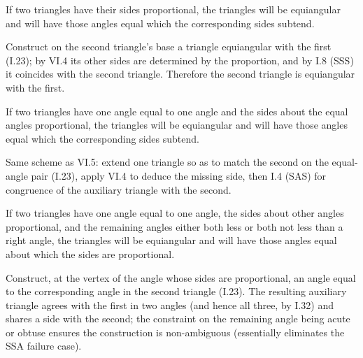 \documentclass{rrxiv}
\begin{document}
\begin{claim}
\label{prop:VI.5}
If two triangles have their sides proportional, the triangles will be
equiangular and will have those angles equal which the corresponding
sides subtend.
\end{claim}
\begin{evidence}[Proof of VI.5]
\label{ev:VI.5}
Construct on the second triangle's base a triangle equiangular with
the first (I.23); by VI.4 its other sides are determined by the
proportion, and by I.8 (SSS) it coincides with the second triangle.
Therefore the second triangle is equiangular with the first.
\end{evidence}

\begin{claim}
\label{prop:VI.6}
If two triangles have one angle equal to one angle and the sides
about the equal angles proportional, the triangles will be
equiangular and will have those angles equal which the corresponding
sides subtend.
\end{claim}
\begin{evidence}[Proof of VI.6]
\label{ev:VI.6}
Same scheme as VI.5: extend one triangle so as to match the second
on the equal-angle pair (I.23), apply VI.4 to deduce the missing
side, then I.4 (SAS) for congruence of the auxiliary triangle with
the second.
\end{evidence}

\begin{claim}
\label{prop:VI.7}
If two triangles have one angle equal to one angle, the sides about
other angles proportional, and the remaining angles either both less
or both not less than a right angle, the triangles will be
equiangular and will have those angles equal about which the sides
are proportional.
\end{claim}
\begin{evidence}[Proof of VI.7]
\label{ev:VI.7}
Construct, at the vertex of the angle whose sides are proportional,
an angle equal to the corresponding angle in the second triangle
(I.23).  The resulting auxiliary triangle agrees with the first in
two angles (and hence all three, by I.32) and shares a side with the
second; the constraint on the remaining angle being acute or obtuse
ensures the construction is non-ambiguous (essentially eliminates
the SSA failure case).
\end{evidence}
\end{document}
